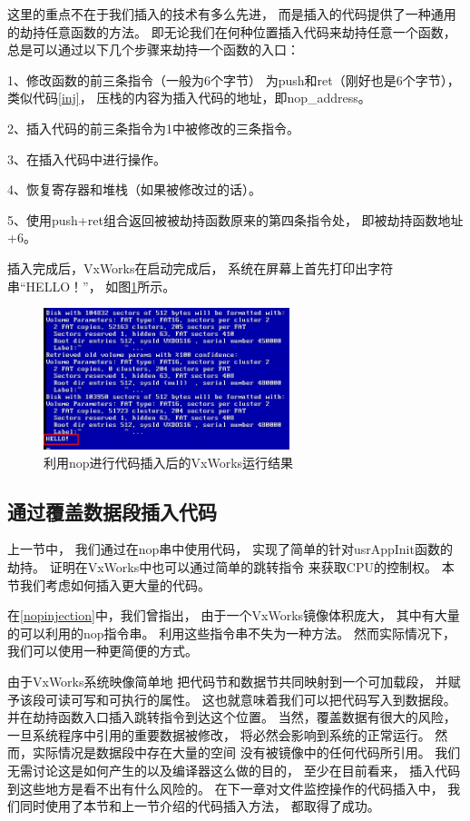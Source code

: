 这里的重点不在于我们插入的技术有多么先进，
而是插入的代码提供了一种通用的劫持任意函数的方法。
即无论我们在何种位置插入代码来劫持任意一个函数，
总是可以通过以下几个步骤来劫持一个函数的入口：

1、修改函数的前三条指令（一般为6个字节）
为push和ret（刚好也是6个字节），类似代码\ref{inj}，
压栈的内容为插入代码的地址，即nop\_address。

2、插入代码的前三条指令为1中被修改的三条指令。

3、在插入代码中进行操作。

4、恢复寄存器和堆栈（如果被修改过的话）。

5、使用push+ret组合返回被被劫持函数原来的第四条指令处，
即被劫持函数地址+6。

插入完成后，VxWorks在启动完成后，
系统在屏幕上首先打印出字符串“HELLO！”，
如图\ref{nophello}所示。

\begin{figure}[h!]
    \centering
    \includegraphics[width=0.64\textwidth]{figure/nophello.jpg}
    \caption{利用nop进行代码插入后的VxWorks运行结果}
    \label{nophello}
\end{figure}

\subsection{通过覆盖数据段插入代码}

上一节中，
我们通过在nop串中使用代码，
实现了简单的针对usrAppInit函数的劫持。
证明在VxWorks中也可以通过简单的跳转指令
来获取CPU的控制权。
本节我们考虑如何插入更大量的代码。

在\ref{nopinjection}中，我们曾指出，
由于一个VxWorks镜像体积庞大，
其中有大量的可以利用的nop指令串。
利用这些指令串不失为一种方法。
然而实际情况下，我们可以使用一种更简便的方式。

由于VxWorks系统映像简单地
把代码节和数据节共同映射到一个可加载段，
并赋予该段可读可写和可执行的属性。
这也就意味着我们可以把代码写入到数据段。
并在劫持函数入口插入跳转指令到达这个位置。
当然，覆盖数据有很大的风险，
一旦系统程序中引用的重要数据被修改，
将必然会影响到系统的正常运行。
然而，实际情况是数据段中存在大量的空间
没有被镜像中的任何代码所引用。
我们无需讨论这是如何产生的以及编译器这么做的目的，
至少在目前看来，
插入代码到这些地方是看不出有什么风险的。
在下一章对文件监控操作的代码插入中，
我们同时使用了本节和上一节介绍的代码插入方法，
都取得了成功。

